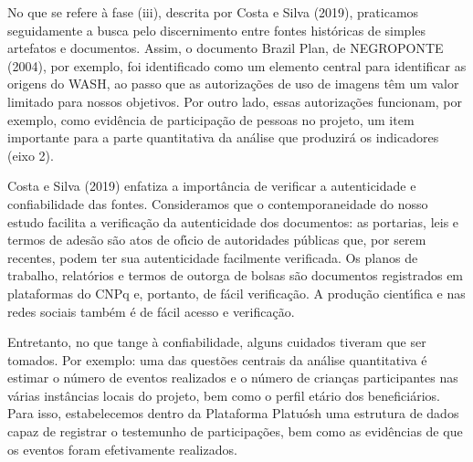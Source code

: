 \documentclass[
12pt,		%
openright,	%
twoside,  %
a4paper,			%
chapter=TITLE,		%
english,			%
french,				%
spanish,			%
brazil				%
]{USPSC-classe/USPSC}
\begin{document}
No que se refere \`a fase (iii), descrita por  Costa e Silva (2019), praticamos seguidamente a busca pelo discernimento entre fontes hist\'oricas de simples artefatos e documentos. Assim, o documento \textquotedbl Brazil Plan\textquotedbl , de  NEGROPONTE (2004), por exemplo, foi identificado como um elemento central para identificar as origens do WASH, ao passo que as autoriza\c{c}\~oes de uso de imagens t\^em um valor limitado para nossos objetivos.  Por outro lado, essas autoriza\c{c}\~oes funcionam, por exemplo, como evid\^encia de participa\c{c}\~ao de pessoas no projeto, um item importante para a parte quantitativa da an\'alise que produzir\'a os indicadores (eixo 2).

















Costa e Silva (2019) enfatiza a import\^ancia de verificar a autenticidade e confiabilidade das fontes. Consideramos que o contemporaneidade do nosso estudo facilita a verifica\c{c}\~ao da autenticidade dos documentos: as portarias, leis e termos de ades\~ao s\~ao atos de of\'{\i}cio de autoridades p\'ublicas que, por serem recentes, podem ter sua autenticidade facilmente verificada. Os planos de trabalho, relat\'orios e termos de outorga de bolsas s\~ao documentos registrados em plataformas do CNPq e, portanto, de f\'acil verifica\c{c}\~ao. A produ\c{c}\~ao cient\'{\i}fica e nas redes sociais tamb\'em \'e de f\'acil acesso e verifica\c{c}\~ao.

















Entretanto, no que tange \`a confiabilidade, alguns cuidados tiveram que ser tomados. Por exemplo: uma das quest\~oes centrais da an\'alise quantitativa \'e estimar o n\'umero de eventos realizados e o n\'umero de crian\c{c}as participantes nas v\'arias inst\^ancias locais do projeto, bem como o perfil et\'ario dos benefici\'arios. Para isso, estabelecemos dentro da Plataforma Platu\'osh uma estrutura de dados capaz de registrar o testemunho de participa\c{c}\~oes, bem como as evid\^encias de que os eventos foram efetivamente realizados.
\end{document}
